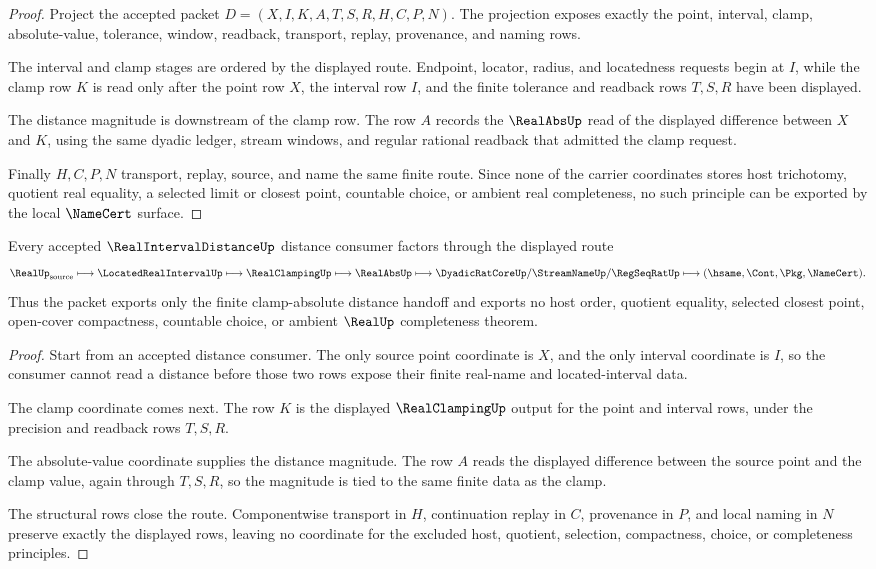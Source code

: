 \begin{proof}
Project the accepted packet $D=(X,I,K,A,T,S,R,H,C,P,N)$. The projection exposes exactly the point, interval, clamp, absolute-value, tolerance, window, readback, transport, replay, provenance, and naming rows.

The interval and clamp stages are ordered by the displayed route. Endpoint, locator, radius, and locatedness requests begin at $I$, while the clamp row $K$ is read only after the point row $X$, the interval row $I$, and the finite tolerance and readback rows $T,S,R$ have been displayed.

The distance magnitude is downstream of the clamp row. The row $A$ records the $\RealAbsUp$ read of the displayed difference between $X$ and $K$, using the same dyadic ledger, stream windows, and regular rational readback that admitted the clamp request.

Finally $H,C,P,N$ transport, replay, source, and name the same finite route. Since none of the carrier coordinates stores host trichotomy, quotient real equality, a selected limit or closest point, countable choice, or ambient real completeness, no such principle can be exported by the local $\NameCert$ surface.
\end{proof}

\begin{theorem}
\label{thm:real-interval-distance-clamp-abs-handoff}
Every accepted $\RealIntervalDistanceUp$ distance consumer factors through the displayed route
$$
\RealUp_{\mathrm{source}}
\longmapsto \LocatedRealIntervalUp
\longmapsto \RealClampingUp
\longmapsto \RealAbsUp
\longmapsto \DyadicRatCoreUp/\StreamNameUp/\RegSeqRatUp
\longmapsto (\hsame,\Cont,\Pkg,\NameCert).
$$
Thus the packet exports only the finite clamp-absolute distance handoff and exports no host order, quotient equality, selected closest point, open-cover compactness, countable choice, or ambient $\RealUp$ completeness theorem.
\end{theorem}

\begin{proof}
Start from an accepted distance consumer. The only source point coordinate is $X$, and the only interval coordinate is $I$, so the consumer cannot read a distance before those two rows expose their finite real-name and located-interval data.

The clamp coordinate comes next. The row $K$ is the displayed $\RealClampingUp$ output for the point and interval rows, under the precision and readback rows $T,S,R$.

The absolute-value coordinate supplies the distance magnitude. The row $A$ reads the displayed difference between the source point and the clamp value, again through $T,S,R$, so the magnitude is tied to the same finite data as the clamp.

The structural rows close the route. Componentwise transport in $H$, continuation replay in $C$, provenance in $P$, and local naming in $N$ preserve exactly the displayed rows, leaving no coordinate for the excluded host, quotient, selection, compactness, choice, or completeness principles.
\end{proof}

